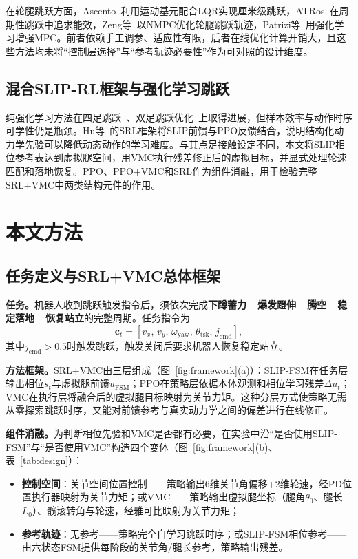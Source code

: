 \documentclass[12pt,a4paper,fontset=fandol]{ctexart}
\numberwithin{equation}{section}
\numberwithin{figure}{section}
\numberwithin{table}{section}
\begin{document}
在轮腿跳跃方面，Ascento~\cite{klemm2020ascento}利用运动基元配合LQR实现厘米级跳跃，ATRos~\cite{sun2025atros}在周期性跳跃中追求能效，Zeng等~\cite{zeng2026jumping}以NMPC优化轮腿跳跃轨迹，Patrizi等~\cite{patrizi2026rlmpc}用强化学习增强MPC。前者依赖手工调参、适应性有限，后者在线优化计算开销大，且这些方法均未将“控制层选择”与“参考轨迹必要性”作为可对照的设计维度。

\subsection{混合SLIP-RL框架与强化学习跳跃}

纯强化学习方法在四足跳跃~\cite{bellegarda2024robust}、双足跳跃优化~\cite{tao2024multiobjective}上取得进展，但样本效率与动作时序可学性仍是瓶颈。Hu等~\cite{hu2026srl}的SRL框架将SLIP前馈与PPO反馈结合，说明结构化动力学先验可以降低动态动作的学习难度。与其点足接触设定不同，本文将SLIP相位参考表达到虚拟腿空间，用VMC执行残差修正后的虚拟目标，并显式处理轮速匹配和落地恢复。PPO、PPO+VMC和SRL作为组件消融，用于检验完整SRL+VMC中两类结构元件的作用。

\section{本文方法}

\subsection{任务定义与SRL+VMC总体框架}

\textbf{任务。}机器人收到跳跃触发指令后，须依次完成\textbf{下蹲蓄力—爆发蹬伸—腾空—稳定落地—恢复站立}的完整周期。任务指令为
\begin{equation}
\bm{c}_t=[v_x,\,v_y,\,\omega_{\mathrm{yaw}},\,\theta_{\mathrm{tsk}},\,j_{\mathrm{cmd}}],
\end{equation}
其中$j_{\mathrm{cmd}}>0.5$时触发跳跃，触发关闭后要求机器人恢复稳定站立。

\textbf{方法框架。}SRL+VMC由三层组成（图~\ref{fig:framework}(a)）：SLIP-FSM在任务层输出相位$s_t$与虚拟腿前馈$u_{\mathrm{FSM}}$；PPO在策略层依据本体观测和相位学习残差$\Delta u_t$；VMC在执行层将融合后的虚拟腿目标映射为关节力矩。这种分层方式使策略无需从零探索跳跃时序，又能对前馈参考与真实动力学之间的偏差进行在线修正。

\textbf{组件消融。}为判断相位先验和VMC是否都有必要，在实验中沿“是否使用SLIP-FSM”与“是否使用VMC”构造四个变体（图~\ref{fig:framework}(b)、表~\ref{tab:design}）：
\begin{itemize}
    \item \textbf{控制空间}：关节空间位置控制——策略输出6维关节角偏移+2维轮速，经PD位置执行器映射为关节力矩；或VMC——策略输出虚拟腿坐标（腿角$\theta_0$、腿长$L_0$）、髋滚转角与轮速，经雅可比映射为关节力矩；
    \item \textbf{参考轨迹}：无参考——策略完全自学习跳跃时序；或SLIP-FSM相位参考——由六状态FSM提供每阶段的关节角/腿长参考，策略输出残差。
\end{itemize}
\end{document}
